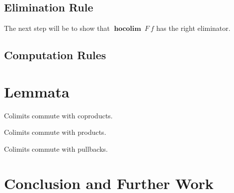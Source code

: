 \documentclass[a4paper,UKenglish]{lipics-v2016}
\newcommand{\hocolim}[0]{\operatorname{\textbf{hocolim}}}
\begin{document}
\subsection{Elimination Rule}
The next step will be to show that $\hocolim \> F \> f$ has the right eliminator.


\subsection{Computation Rules}

\section{Lemmata}
\label{sec:Lemmata}

\begin{lemma}
Colimits commute with coproducts.
\end{lemma}

\begin{lemma}
Colimits commute with products.
\end{lemma}

\begin{lemma}
Colimits commute with pullbacks.
\end{lemma}

\section{Conclusion and Further Work}



\nocite{*}





\end{document}

